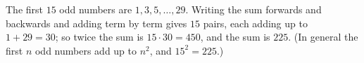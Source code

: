The first $15$ odd numbers are $1,3,5,\dots,29$. Writing the sum forwards and backwards and adding term by term gives $15$ pairs, each adding up to $1+29=30$; so twice the sum is $15\cdot30=450$, and the sum is $\boxed{225}$. (In general the first $n$ odd numbers add up to $n^2$, and $15^2=225$.)
